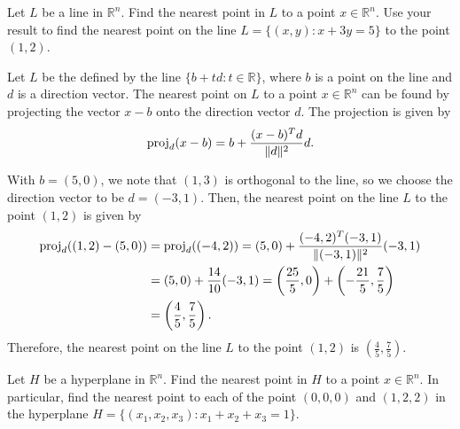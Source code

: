\begin{exercise}
  Let $L$ be a line in $\mathbb{R}^n$.
  Find the nearest point in $L$ to a point $x \in \mathbb{R}^n$.
  Use your result to find the nearest point on the line $L = \{ (x, y) : x + 3y = 5 \}$ to the point $(1, 2)$.
\end{exercise}

\begin{solution}
  Let $L$ be the defined by the line $\{ b + t d : t \in \mathbb{R} \}$, where $b$ is a point on the line and $d$ is a direction vector.
  The nearest point on $L$ to a point $x \in \mathbb{R}^n$ can be found by projecting the vector $x - b$ onto the direction vector $d$.
  The projection is given by
  \begin{equation}
    \mathrm{proj}_d (x - b) = b + \frac{(x - b)^T d}{\lVert d\rVert^2} d.
  \end{equation}

  With $b = (5, 0)$, we note that $(1, 3)$ is orthogonal to the line, so we choose the direction vector to be $d = (-3, 1)$.
  Then, the nearest point on the line $L$ to the point $(1, 2)$ is given by
  \begin{equation}
    \begin{split}
      \mathrm{proj}_d ((1, 2) - (5, 0)) &= \mathrm{proj}_d ((-4, 2))
      = (5, 0) + \frac{(-4, 2)^T (-3, 1)}{\lVert(-3, 1)\rVert^2} (-3, 1) \\
      &= (5, 0) + \frac{14}{10} (-3, 1)
      =\left(\frac{25}{5}, 0\right) + \left(-\frac{21}{5}, \frac{7}{5}\right) \\
      &= \left(\frac{4}{5}, \frac{7}{5}\right).
    \end{split}
  \end{equation}
  Therefore, the nearest point on the line $L$ to the point $(1, 2)$ is $\left(\frac{4}{5}, \frac{7}{5}\right)$.
\end{solution}

\begin{exercise}
  Let $H$ be a hyperplane in $\mathbb{R}^n$.
  Find the nearest point in $H$ to a point $x \in \mathbb{R}^n$.
  In particular, find the nearest point to each of the point $(0,0,0)$ and $(1,2,2)$ in the hyperplane $H = \{ (x_1, x_2, x_3) : x_1 + x_2 + x_3 = 1 \}$.
\end{exercise}

